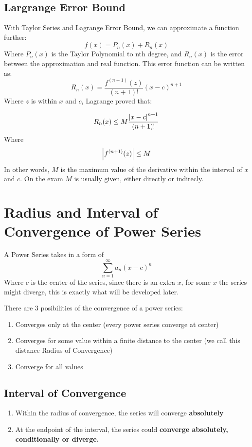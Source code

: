 \documentclass{article}
\numberwithin{equation}{section}
\begin{document}
\newpage
\subsection{Largrange Error Bound}
With Taylor Series and Lagrange Error Bound, we can approximate a function further:
\[
    f(x) = P_n(x) + R_n(x)
\]
Where $P_n(x)$ is the Taylor Polynomial to nth degree, and $R_n(x)$ is the error between the approximation and real function.
This error function can be written as:
\[
    R_n(x) = \frac{f^{(n+1)}(z)}{(n+1)!}(x-c)^{n+1}
\]
Where $z$ is within $x$ and $c$, Lagrange proved that:

\[
    R_n(x) \leq M\frac{{\abs{x-c}^{n+1}}}{(n+1)!}
\]
Where 
\[
    \abs{f^{(n+1)}(z)} \leq M
\]
In other words, $M$ is the maximum value of the derivative within the interval of $x$ and $c$.
On the exam $M$ is usually given, either directly or indirecly.

\section{Radius and Interval of Convergence of Power Series}
A Power Series takes in a form of
\[
    \sum_{n = 1}^{\infty}a_n (x-c)^n
\]
Where $c$ is the center of the series, since there is an extra $x$, for some $x$ the series might diverge, this is exactly what will be developed later.

There are 3 posibilities of the convergence of a power series:
\begin{enumerate}
    \item Converges only at the center (every power series converge at center)
    \item Converges for some value within a finite distance to the center (we call this distance Radius of Convergence)
    \item Converge for all values
\end{enumerate}

\subsection{Interval of Convergence}
\begin{enumerate}
    \item Within the radius of convergence, the series will converge \textbf{absolutely}
    \item At the endpoint of the interval, the series could \textbf{converge absolutely, conditionally or diverge.}
\end{enumerate}
\end{document}
